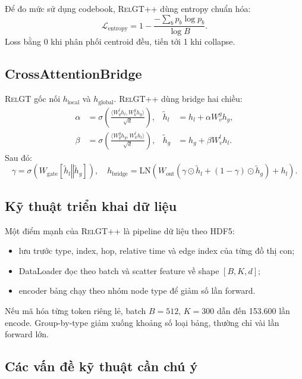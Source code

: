 \documentclass[12pt,a4paper]{article}
\newcommand{\RelGT}{\textsc{RelGT}}
\newcommand{\RelGTpp}{\textsc{RelGT++}}
\newcommand{\concat}{\mathbin{\Vert}}
\begin{document}
Để đo mức sử dụng codebook, \RelGTpp{} dùng entropy chuẩn hóa:
\[
  \mathcal{L}_\text{entropy}
  =1-\frac{-\sum_b p_b\log p_b}{\log B}.
\]
Loss bằng 0 khi phân phối centroid đều, tiến tới 1 khi collapse.

\subsection{CrossAttentionBridge}

\RelGT{} gốc nối $h_\text{local}$ và $h_\text{global}$. \RelGTpp{} dùng bridge
hai chiều:
\begin{align}
  \alpha &= \sigma\left(
  \frac{\langle W_q^lh_l,W_k^gh_g\rangle}{\sqrt{d}}\right),&
  \tilde{h}_l &= h_l+\alpha W_v^g h_g,\\
  \beta &= \sigma\left(
  \frac{\langle W_q^gh_g,W_k^lh_l\rangle}{\sqrt{d}}\right),&
  \tilde{h}_g &= h_g+\beta W_v^l h_l.
\end{align}
Sau đó:
\[
  \gamma=\sigma(W_\text{gate}[\tilde{h}_l\concat\tilde{h}_g]),\quad
  h_\text{bridge}=\text{LN}\left(
  W_\text{out}(\gamma\odot\tilde{h}_l+(1-\gamma)\odot\tilde{h}_g)+h_l
  \right).
\]

\subsection{Kỹ thuật triển khai dữ liệu}

Một điểm mạnh của \RelGTpp{} là pipeline dữ liệu theo HDF5:
\begin{itemize}
  \item lưu trước type, index, hop, relative time và edge index của từng đồ
        thị con;
  \item DataLoader đọc theo batch và scatter feature về shape $[B,K,d]$;
  \item encoder bảng chạy theo nhóm node type để giảm số lần forward.
\end{itemize}

Nếu mã hóa từng token riêng lẻ, batch $B=512$, $K=300$ dẫn đến 153.600 lần
encode. Group-by-type giảm xuống khoảng số loại bảng, thường chỉ vài lần
forward lớn.

\subsection{Các vấn đề kỹ thuật cần chú ý}
\end{document}
